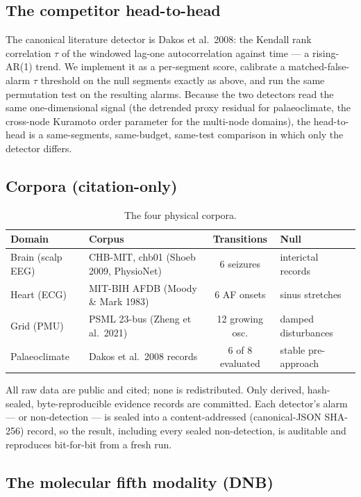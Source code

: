 \documentclass[11pt]{article}
\begin{document}
\subsection{The competitor head-to-head}

The canonical literature detector is Dakos et al.\ 2008: the Kendall
rank correlation $\tau$ of the windowed lag-one autocorrelation against
time --- a rising-AR(1) trend. We implement it as a per-segment score,
calibrate a matched-false-alarm $\tau$ threshold on the null segments
exactly as above, and run the same permutation test on the resulting
alarms. Because the two detectors read the same one-dimensional signal
(the detrended proxy residual for palaeoclimate, the cross-node
Kuramoto order parameter for the multi-node domains), the head-to-head
is a same-segments, same-budget, same-test comparison in which only the
detector differs.

\subsection{Corpora (citation-only)}

\begin{table}[h!]
\centering
\small
\setlength{\tabcolsep}{4pt}
\begin{tabular}{llcl}
\toprule
Domain & Corpus & Transitions & Null \\
\midrule
Brain (scalp EEG) & CHB-MIT, chb01 (Shoeb 2009, PhysioNet) & 6 seizures & interictal records \\
Heart (ECG) & MIT-BIH AFDB (Moody \& Mark 1983) & 6 AF onsets & sinus stretches \\
Grid (PMU) & PSML 23-bus (Zheng et al.\ 2021) & 12 growing osc. & damped disturbances \\
Palaeoclimate & Dakos et al.\ 2008 records & 6 of 8 evaluated & stable pre-approach \\
\bottomrule
\end{tabular}
\caption{The four physical corpora.}
\end{table}

All raw data are public and cited; none is redistributed. Only derived,
hash-sealed, byte-reproducible evidence records are committed. Each
detector's alarm --- or non-detection --- is sealed into a
content-addressed (canonical-JSON SHA-256) record, so the result,
including every sealed non-detection, is auditable and reproduces
bit-for-bit from a fresh run.

\subsection{The molecular fifth modality (DNB)}
\end{document}
